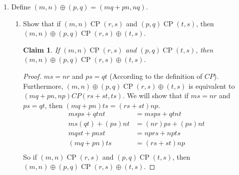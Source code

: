 \documentclass[11pt]{letter}
\newtheorem{claim}{Claim}
\theoremstyle{definition}
\begin{document}
\begin{description}
\begin{enumerate}
			\item Define $(m,n)\oplus(p,q)=(mq+pn,nq)$. 
				\begin{enumerate}
				\item Show that if $(m,n)\operatorname{CP} (r,s)$ and $(p,q)\operatorname{CP}(t,s)$, then $(m,n)\oplus(p,q)\operatorname{CP}(r,s)\oplus(t,s)$.
                                  \begin{claim}
                                    If $(m,n)\operatorname{CP} (r,s)$ and $(p,q)\operatorname{CP}(t,s)$, then $(m,n)\oplus(p,q)\operatorname{CP}(r,s)\oplus(t,s)$.
                                  \end{claim}
                                  \begin{proof}
                                    $ms=nr$ and $ps=qt$ (According to the definition of $CP$). Furthermore,  $(m,n)\oplus(p,q)\operatorname{CP}(r,s)\oplus(t,s)$ is equivalent to $(mq+pn,np)CP(rs+st,ts)$. We will show that if $ms=nr$ and $ps=qt$, then $(mq+pn)ts=(rs+st)np$.
                                    \begin{align*}
                                      msps+qtnt&=msps+qtnt \tag{Used fact that $ms=nr$ and $ps=qt$}\\                                  
                                      ms(qt)+(ps)nt&=(nr)ps+(ps)nt\\
                                      mqst+pnst&=nprs+npts\\
                                      (mq+pn)ts&=(rs+st)np\\
                                    \end{align*}
                                    So if $(m,n)\operatorname{CP} (r,s)$ and $(p,q)\operatorname{CP}(t,s)$, then $(m,n)\oplus(p,q)\operatorname{CP}(r,s)\oplus(t,s)$.                                                 \end{proof}
                                  

\end{enumerate}
\end{enumerate}
\end{description}
\end{document}
